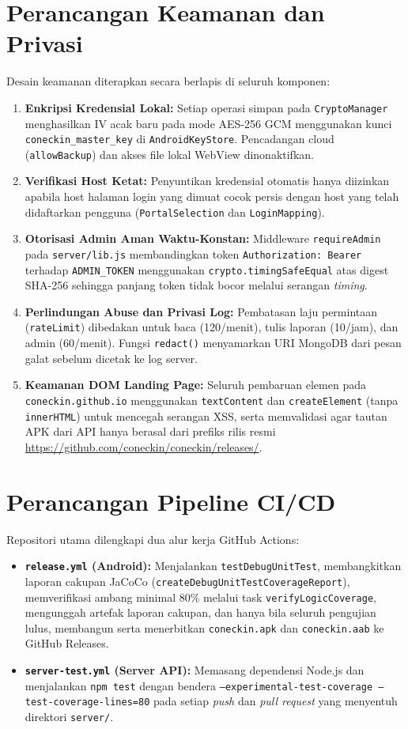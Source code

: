 \section{Perancangan Keamanan dan Privasi}
Desain keamanan diterapkan secara berlapis di seluruh komponen:
\begin{enumerate}[leftmargin=*]
  \item \textbf{Enkripsi Kredensial Lokal:} Setiap operasi simpan pada \texttt{CryptoManager} menghasilkan IV acak baru pada mode AES-256 GCM menggunakan kunci \texttt{coneckin\_master\_key} di \texttt{AndroidKeyStore}. Pencadangan cloud (\texttt{allowBackup}) dan akses file lokal WebView dinonaktifkan.
  \item \textbf{Verifikasi Host Ketat:} Penyuntikan kredensial otomatis hanya diizinkan apabila host halaman login yang dimuat cocok persis dengan host yang telah didaftarkan pengguna (\texttt{PortalSelection} dan \texttt{LoginMapping}).
  \item \textbf{Otorisasi Admin Aman Waktu-Konstan:} Middleware \texttt{requireAdmin} pada \texttt{server/lib.js} membandingkan token \texttt{Authorization: Bearer} terhadap \texttt{ADMIN\_TOKEN} menggunakan \texttt{crypto.timingSafeEqual} atas digest SHA-256 sehingga panjang token tidak bocor melalui serangan \textit{timing}.
  \item \textbf{Perlindungan Abuse dan Privasi Log:} Pembatasan laju permintaan (\texttt{rateLimit}) dibedakan untuk baca (120/menit), tulis laporan (10/jam), dan admin (60/menit). Fungsi \texttt{redact()} menyamarkan URI MongoDB dari pesan galat sebelum dicetak ke log server.
  \item \textbf{Keamanan DOM Landing Page:} Seluruh pembaruan elemen pada \texttt{coneckin.github.io} menggunakan \texttt{textContent} dan \texttt{createElement} (tanpa \texttt{innerHTML}) untuk mencegah serangan XSS, serta memvalidasi agar tautan APK dari API hanya berasal dari prefiks rilis resmi \url{https://github.com/coneckin/coneckin/releases/}.
\end{enumerate}

\section{Perancangan Pipeline CI/CD}
Repositori utama dilengkapi dua alur kerja GitHub Actions:
\begin{itemize}[leftmargin=*]
  \item \textbf{\texttt{release.yml} (Android):} Menjalankan \texttt{testDebugUnitTest}, membangkitkan laporan cakupan JaCoCo (\texttt{createDebugUnitTestCoverageReport}), memverifikasi ambang minimal 80\% melalui task \texttt{verifyLogicCoverage}, mengunggah artefak laporan cakupan, dan hanya bila seluruh pengujian lulus, membangun serta menerbitkan \texttt{coneckin.apk} dan \texttt{coneckin.aab} ke GitHub Releases.
  \item \textbf{\texttt{server-test.yml} (Server API):} Memasang dependensi Node.js dan menjalankan \texttt{npm test} dengan bendera \texttt{--experimental-test-coverage --test-coverage-lines=80} pada setiap \textit{push} dan \textit{pull request} yang menyentuh direktori \texttt{server/}.
\end{itemize}
